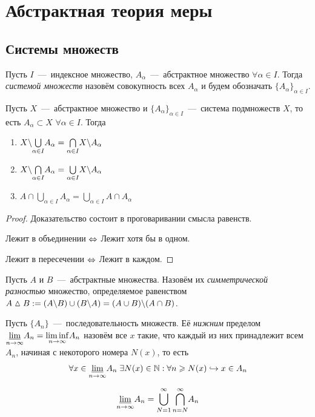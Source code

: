 \section{Абстрактная теория меры}
\subsection{Системы множеств}
\begin{definition}
    Пусть $I$~---~индексное множество, $A_\alpha$~---~абстрактное множество $\forall \alpha \in I$. Тогда \textit{системой множеств} назовём совокупность всех $A_\alpha$ и будем обозначать $\{A_\alpha\}_{\alpha \in I}$.
\end{definition}

\begin{lemma}
Пусть $X$~---~абстрактное множество и $\{A_\alpha\}_{\alpha \in I}$~---~система подмножеств $X$, то есть $A_\alpha \subset X$ $\forall \alpha \in I$. Тогда \begin{enumerate}
    \item $X \backslash \underset{\alpha \in I}{\bigcup} A_\alpha = \underset{\alpha \in I}{\bigcap} X \backslash A_\alpha$
    \item $X \backslash \underset{\alpha \in I}{\bigcap} A_\alpha = \underset{\alpha \in I}{\bigcup} X \backslash A_\alpha$
    \item $A \cap \underset{\alpha \in I}{\bigcup} A_\alpha = \underset{\alpha \in I}{\bigcup} A \cap A_\alpha$
\end{enumerate}
\end{lemma}

\begin{proof}
    Доказательство состоит в проговаривании смысла равенств.
    
    Лежит в объединении $\Leftrightarrow$ Лежит хотя бы в одном.
    
    Лежит в пересечении $\Leftrightarrow$ Лежит в каждом.
\end{proof}

\begin{definition}
    Пусть $A$ и $B$~---~абстрактные множества. Назовём их \textit{симметрической разностью} множество, определяемое равенством $A \vartriangle B := (A \backslash B) \cup (B \backslash A) = (A \cup B) \backslash (A \cap B)$.
\end{definition}

\begin{definition}
    Пусть $\{A_n\}$~---~последовательность множеств. Её \textit{нижним} пределом $\underset{n \rightarrow \infty}{\underline{\lim}} A_n = \underset{n \rightarrow \infty}{\liminf} A_n$ назовём все $x$ такие, что каждый из них принадлежит всем $A_n$, начиная с некоторого номера $N(x)$, то есть 
    \[\forall x \in \underset{n \rightarrow \infty}{\underline{\lim}} A_n \; \exists N(x) \in \mathbb{N} : \forall n \geqslant N(x) \hookrightarrow x \in A_n\]
    
    \[\underset{n \rightarrow \infty}{\underline{\lim}} A_n = \overset{\infty}{\underset{N = 1}{\bigcup}} \, \overset{\infty}{\underset{n = N}{\bigcap}}A_n\]
\end{definition}

